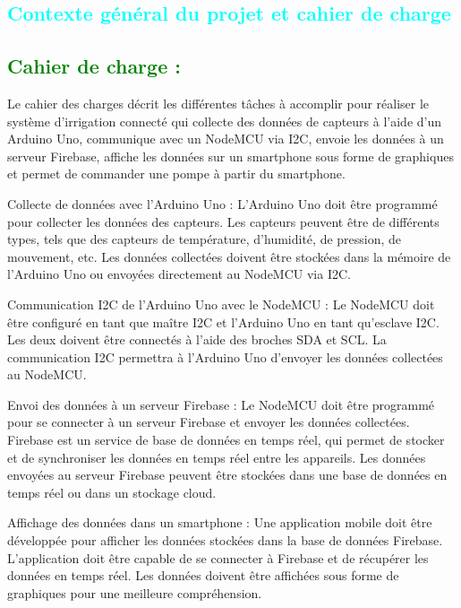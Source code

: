 \begin{flushleft}
	\section{\textcolor{cyan}{Contexte général du projet et cahier de charge}}
	\subsection{\textcolor{green}{Cahier de charge :}}
	Le cahier des charges décrit les différentes tâches à accomplir pour réaliser le système d'irrigation connecté qui collecte des données de capteurs à l'aide d'un Arduino Uno, communique avec un NodeMCU via I2C, envoie les données à un serveur Firebase, affiche les données sur un smartphone sous forme de graphiques et permet de commander une pompe à partir du smartphone.\newline
	
	Collecte de données avec l'Arduino Uno :
	L'Arduino Uno doit être programmé pour collecter les données des capteurs. Les capteurs peuvent être de différents types, tels que des capteurs de température, d'humidité, de pression, de mouvement, etc. Les données collectées doivent être stockées dans la mémoire de l'Arduino Uno ou envoyées directement au NodeMCU via I2C.\newline
	
	Communication I2C de l'Arduino Uno avec le NodeMCU :
	Le NodeMCU doit être configuré en tant que maître I2C et l'Arduino Uno en tant qu'esclave I2C. Les deux doivent être connectés à l'aide des broches SDA et SCL. La communication I2C permettra à l'Arduino Uno d'envoyer les données collectées au NodeMCU.\newline
	
	Envoi des données à un serveur Firebase :
	Le NodeMCU doit être programmé pour se connecter à un serveur Firebase et envoyer les données collectées. Firebase est un service de base de données en temps réel, qui permet de stocker et de synchroniser les données en temps réel entre les appareils. Les données envoyées au serveur Firebase peuvent être stockées dans une base de données en temps réel ou dans un stockage cloud.\newline
	
	Affichage des données dans un smartphone :
	Une application mobile doit être développée pour afficher les données stockées dans la base de données Firebase. L'application doit être capable de se connecter à Firebase et de récupérer les données en temps réel. Les données doivent être affichées sous forme de graphiques pour une meilleure compréhension.\newline
	

\end{flushleft}
